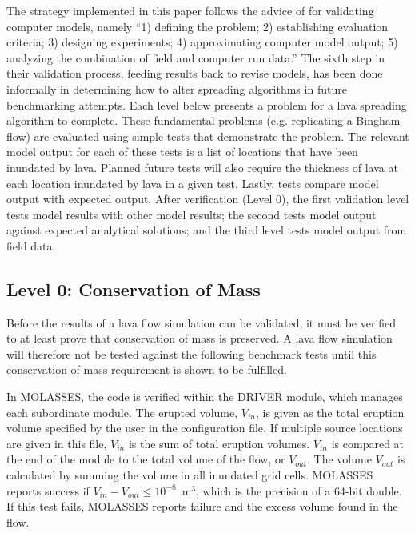 \documentclass[12pt,letter]{article}
\begin{document}
	The strategy implemented in this paper follows the advice of \citet{bayarri2007framework} for validating computer models, namely ``1) defining the problem; 2) establishing evaluation criteria; 3) designing experiments; 4) approximating computer model output; 5) analyzing the combination of field and computer run data.'' The sixth step in their validation process, feeding results back to revise models, has been done informally in determining how to alter spreading algorithms in future benchmarking attempts. Each level below presents a problem for a lava spreading algorithm to complete. These fundamental problems (e.g. replicating a Bingham flow) are evaluated using simple tests that demonstrate the problem. The relevant model output for each of these tests is a list of locations that have been inundated by lava. Planned future tests will also require the thickness of lava at each location inundated by lava in a given test. Lastly, tests compare model output with expected output. After verification (Level 0), the first validation level tests model results with other model results; the second tests model output against expected analytical solutions; and the third level tests model output from field data.

	\subsection{Level 0: Conservation of Mass}
			Before the results of a lava flow simulation can be validated, it must be verified to at least prove that conservation of mass is preserved. A lava flow simulation will therefore not be tested against the following benchmark tests until this conservation of mass requirement is shown to be fulfilled.
			
			In MOLASSES, the code is verified within the DRIVER module, which manages each subordinate module. The erupted volume, $V_{in}$, is given as the total eruption volume specified by the user in the configuration file. If multiple source locations are given in this file, $V_{in}$ is the sum of total eruption volumes. $V_{in}$ is compared at the end of the module to the total volume of the flow, or $V_{out}$. The volume $V_{out}$ is calculated by summing the volume in all inundated grid cells. MOLASSES reports success if $V_{in}-V_{out} \le 10^{-8}$~m$^3$, which is the precision of a 64-bit double. If this test fails, MOLASSES reports failure and the excess volume found in the flow.
	
\end{document}
